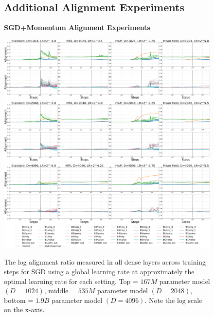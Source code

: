 \clearpage
\begin{figure}[ht]
\subsection{Additional Alignment Experiments}
\label{app:alignment_expts}
\figvspace
\figvspace
    \begin{center}
        \textbf{SGD+Momentum Alignment Experiments}\\
        \figvspace
        
        \includegraphics[width=\linewidth, trim={0, 0, 0, 0},clip]{icml2024/figures/alignment/appendix/sgdw_v2+momentum_1024.pdf}
       
        \figvspace
        \figvspace
       
        \includegraphics[width=\linewidth, trim={0, 0, 0, 0},clip]{icml2024/figures/alignment/appendix/sgdw_v2+momentum_2048.pdf}
       
        \figvspace
        \figvspace
       
        \includegraphics[width=\linewidth, trim={0, 0, 0, 0},clip]{icml2024/figures/alignment/appendix/sgdw_v2+momentum_4096_legend.pdf}
        \caption{The log alignment ratio measured in all dense layers across training steps for SGD using a global learning rate at approximately the optimal learning rate for each setting. Top = $167M$ parameter model $(D=1024)$, middle = $535M$ parameter model $(D=2048)$, bottom = $1.9B$ parameter model $(D=4096)$. Note the log scale on the x-axis.}
        \figvspace
        \label{fig:appendix_alignment_sgd}
    \end{center}
\end{figure}
\clearpage

